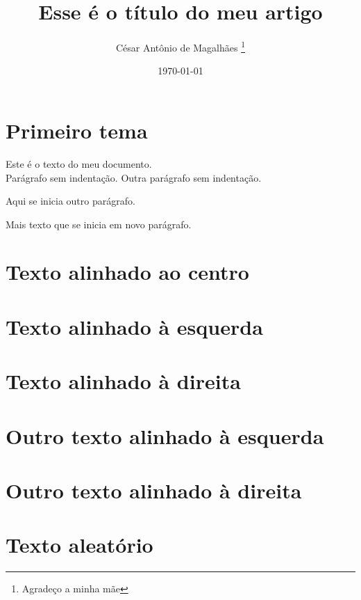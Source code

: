 \documentclass[12pt, a4paper, twocolumn]{article}
\title{Esse é o título do meu artigo}
\author{César Antônio de Magalhães \thanks{Agradeço a minha mãe}}
\date{\today}
\begin{document}
	
\begin{titlepage}
	\maketitle
\end{titlepage}

\begin{abstract}
	\lipsum[1]
\end{abstract}

\section{Primeiro tema}

Este é o texto do meu documento.
\\ Parágrafo sem indentação.
\newline Outra parágrafo sem indentação. 
\par Aqui se inicia outro parágrafo. 

 Mais texto que se inicia em novo parágrafo. 

\section{Texto alinhado ao centro}

\begin{center}
	\lipsum[1]
\end{center}

\section{Texto alinhado à esquerda}

\begin{flushleft}
	\lipsum[1]
\end{flushleft}

\section{Texto alinhado à direita}

\begin{flushright}
	\lipsum[1]
\end{flushright}

\section{Outro texto alinhado à esquerda}
\raggedright
\lipsum[1]

\section{Outro texto alinhado à direita}
\raggedleft
\lipsum[1]

\justifying

\section{Texto aleatório}

\lipsum
\end{document}
